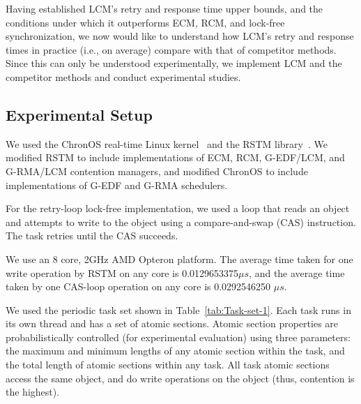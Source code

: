 Having established LCM's retry and response time upper bounds, and the conditions under which it outperforms ECM, RCM, and lock-free synchronization, we now would like to understand how LCM's retry and response times in practice (i.e., on average) compare with that of competitor methods. Since this can only be understood experimentally, we implement LCM and the competitor methods and conduct experimental studies. 

\subsection{Experimental Setup}
We used the ChronOS real-time Linux kernel~\cite{dellinger2011chronos}
and the RSTM library~\cite{marathe2006lowering}. We modified RSTM to include implementations of ECM, RCM, G-EDF/LCM, and G-RMA/LCM contention managers, and modified ChronOS to include implementations of G-EDF and G-RMA schedulers. 

For the retry-loop lock-free implementation,
we used a loop that reads an object and attempts to write to the object using a compare-and-swap (CAS) instruction. The task retries until the CAS succeeds. 

We use an 8 core, 2GHz AMD Opteron platform. The average time
taken for one write operation by RSTM on any
core is 0.0129653375$\mu s$, and the average time taken
by one CAS-loop operation on any core is 0.0292546250 $\mu s$.

We used the periodic task set shown in Table~\ref{tab:Task-set-1}. Each task runs in its own thread and has a set of atomic sections. Atomic section properties are probabilistically controlled (for experimental evaluation) using three parameters: the maximum and minimum lengths of any atomic section within the task, and the total length of atomic sections within any task. All task atomic sections access the same object, and do write operations on the object (thus, contention is the highest).

